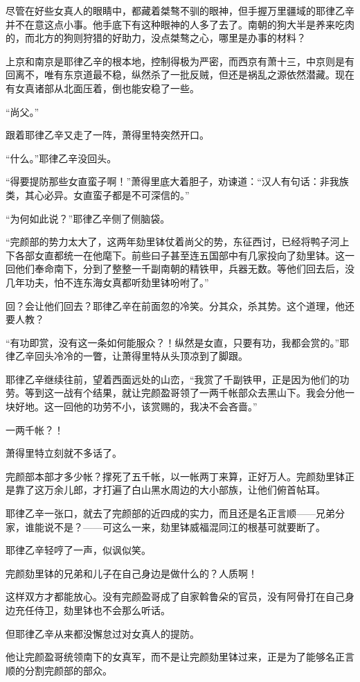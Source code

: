 尽管在好些女真人的眼睛中，都藏着桀骜不驯的眼神，但手握万里疆域的耶律乙辛并不在意这点小事。他手底下有这种眼神的人多了去了。南朝的狗大半是养来吃肉的，而北方的狗则狩猎的好助力，没点桀骜之心，哪里是办事的材料？

上京和南京是耶律乙辛的根本地，控制得极为严密，而西京有萧十三，中京则是有回离不，唯有东京道最不稳，纵然杀了一批反贼，但还是祸乱之源依然潜藏。现在有女真诸部从北面压着，倒也能安稳了一些。

“尚父。”

跟着耶律乙辛又走了一阵，萧得里特突然开口。

“什么。”耶律乙辛没回头。

“得要提防那些女直蛮子啊！”萧得里底大着胆子，劝谏道：“汉人有句话：非我族类，其心必异。女直蛮子都是不可深信的。”

“为何如此说？”耶律乙辛侧了侧脑袋。

“完颜部的势力太大了，这两年劾里钵仗着尚父的势，东征西讨，已经将鸭子河上下各部女直都统一在他麾下。前些曰子甚至连五国部中有几家投向了劾里钵。这一回他们奉命南下，分到了整整一千副南朝的精铁甲，兵器无数。等他们回去后，没几年功夫，怕不连东海女真都听劾里钵吩咐了。”

回？会让他们回去？耶律乙辛在前面忽的冷笑。分其众，杀其势。这个道理，他还要人教？

“有功即赏，没有这一条如何能服众？！纵然是女直，只要有功，我都会赏的。”耶律乙辛回头冷冷的一瞥，让萧得里特从头顶凉到了脚跟。

耶律乙辛继续往前，望着西面远处的山峦，“我赏了千副铁甲，正是因为他们的功劳。等到这一战有个结果，就让完颜盈哥领了一两千帐部众去黑山下。我会分他一块好地。这一回他的功劳不小，该赏赐的，我决不会吝啬。”

一两千帐？！

萧得里特立刻就不多话了。

完颜部本部才多少帐？撑死了五千帐，以一帐两丁来算，正好万人。完颜劾里钵正是靠了这万余儿郎，才打遍了白山黑水周边的大小部族，让他们俯首帖耳。

耶律乙辛一张口，就去了完颜部的近四成的实力，而且还是名正言顺——兄弟分家，谁能说不是？——可这么一来，劾里钵威福混同江的根基可就要断了。

耶律乙辛轻哼了一声，似讽似笑。

完颜劾里钵的兄弟和儿子在自己身边是做什么的？人质啊！

这样双方才都能放心。没有完颜盈哥成了自家斡鲁朵的官员，没有阿骨打在自己身边充任侍卫，劾里钵也不会那么听话。

但耶律乙辛从来都没懈怠过对女真人的提防。

他让完颜盈哥统领南下的女真军，而不是让完颜劾里钵过来，正是为了能够名正言顺的分割完颜部的部众。

